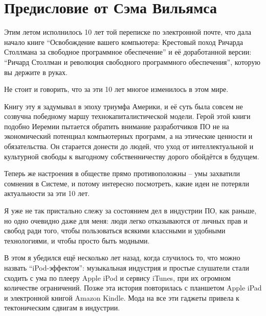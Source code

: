 
\chapter{Предисловие от Сэма Вильямса}

Этим летом исполнилось 10 лет той переписке по электронной почте,
что дала начало книге \enquote{Освобождение вашего компьютера: Крестовый
поход Ричарда Столлмана за свободное программное обеспечение} и её
доработанной версии: \enquote{Ричард Столлман и революция свободного
программного обеспечения}, которую вы держите в руках.

Не стоит и говорить, что за эти 10 лет многое изменилось в этом мире.

Книгу эту я задумывал в эпоху триумфа Америки, и её суть была совсем
не созвучна победному маршу технокапиталистической модели.
Герой этой книги подобно Иеремии пытается обратить внимание
разработчиков ПО не на экономический потенциал компьютерных
программ, а на этические ценности и обязательства. Он старается донести
до людей, что уход от интеллектуальной и культурной свободы к
выгодному собственничеству дорого обойдётся в будущем.

Теперь же настроения в обществе прямо противоположны -- умы
захватили сомнения в Системе, и потому интересно посмотреть,
какие идеи не потеряли актуальности за эти 10 лет.

Я уже не так пристально слежу за состоянием дел в индустрии ПО,
как раньше, но одно очевидно даже для меня: люди легко отказываются
от личных прав и свобод ради того, чтобы пользоваться всякими
классными и удобными технологиями, и чтобы просто быть модными.

В этом я убедился ещё несколько лет назад, когда случилось то, что
можно назвать \enquote{iPod-эффектом}: музыкальная индустрия и простые
слушатели стали сходить с ума по плееру Apple iPod и сервису iTunes,
при их огромном количестве ограничений. Позже эта история повторилась
с планшетом Apple iPad и электронной книгой Amazon Kindle. Мода на
все эти гаджеты привела к тектоническим сдвигам в индустрии.


